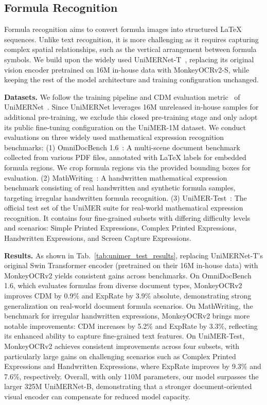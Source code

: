 \documentclass{article}
\begin{document}
\subsection{Formula Recognition}
    Formula recognition aims to convert formula images into structured LaTeX sequences. Unlike text recognition, it is more challenging as it requires capturing complex spatial relationships, such as the vertical arrangement between formula symbols. We build upon the widely used UniMERNet-T~\cite{unimernet}, replacing its original vision encoder pretrained on 16M in-house data with MonkeyOCRv2-S, while keeping the rest of the model architecture and training configuration unchanged.

    
    \textbf{Datasets.} We follow the training pipeline and CDM evaluation metric~\cite{cdm} of UniMERNet~\cite{unimernet}. Since UniMERNet leverages 16M unreleased in-house samples for additional pre-training, we exclude this closed pre-training stage and only adopt its public fine-tuning configuration on the UniMER-1M dataset.  We conduct evaluations on three widely used mathematical expression recognition benchmarks: (1) OmniDocBench 1.6~\cite{omnidocbench}: A multi-scene document benchmark collected from various PDF files, annotated with LaTeX labels for embedded formula regions. We crop formula regions via the provided bounding boxes for evaluation. (2) MathWriting~\cite{mathwriting}: A handwritten mathematical expression benchmark consisting of real handwritten and synthetic formula samples, targeting irregular handwritten formula recognition. (3) UniMER-Test~\cite{unimernet}: The official test set of the UniMER suite for real-world mathematical expression recognition. It contains four fine-grained subsets 
    with differing difficulty levels and scenarios: Simple Printed Expressions, Complex Printed Expressions, Handwritten Expressions, and Screen Capture Expressions. 
    
    \textbf{Results.} As shown in Tab.~\ref{tab:unimer_test_results}, replacing UniMERNet-T's original Swin Transformer encoder (pretrained on their 16M in-house data) with MonkeyOCRv2 yields consistent gains across benchmarks. On OmniDocBench 1.6, which evaluates formulas from diverse document types, MonkeyOCRv2 improves CDM by 0.9\% and ExpRate by 3.9\% absolute, demonstrating strong generalization on real-world document formula scenarios. On MathWriting, the benchmark for irregular handwritten expressions, MonkeyOCRv2 brings more notable improvements: CDM increases by 5.2\% and ExpRate by 3.3\%, reflecting its enhanced ability to capture fine-grained text features. On 
    UniMER-Test, MonkeyOCRv2 achieves consistent improvements across four subsets, with particularly large gains on challenging scenarios such as Complex Printed Expressions and Handwritten Expressions, where ExpRate improves by 9.3\% and 7.6\%, respectively. Overall, with only 110M parameters, our model surpasses the larger 325M UniMERNet-B, 
    demonstrating that a stronger document-oriented visual encoder can compensate for reduced model capacity.
\end{document}
